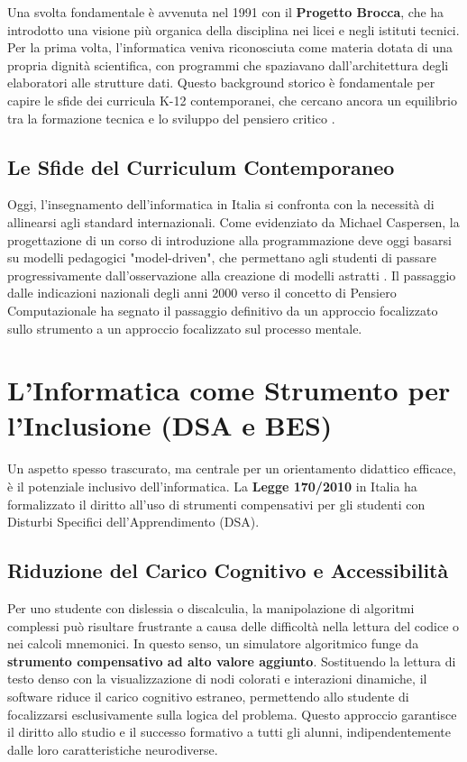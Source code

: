 \documentclass[openany]{theme/uniprthesis}
\begin{document}
Una svolta fondamentale è avvenuta nel 1991 con il \textbf{Progetto Brocca}, che ha introdotto una visione più organica della disciplina nei licei e negli istituti tecnici. Per la prima volta, l'informatica veniva riconosciuta come materia dotata di una propria dignità scientifica, con programmi che spaziavano dall'architettura degli elaboratori alle strutture dati. Questo background storico è fondamentale per capire le sfide dei curricula K-12 contemporanei, che cercano ancora un equilibrio tra la formazione tecnica e lo sviluppo del pensiero critico \cite{gal2014tale}.

\subsection{Le Sfide del Curriculum Contemporaneo}
Oggi, l'insegnamento dell'informatica in Italia si confronta con la necessità di allinearsi agli standard internazionali. Come evidenziato da Michael Caspersen, la progettazione di un corso di introduzione alla programmazione deve oggi basarsi su modelli pedagogici "model-driven", che permettano agli studenti di passare progressivamente dall'osservazione alla creazione di modelli astratti \cite{caspersen2007instructional}. Il passaggio dalle indicazioni nazionali degli anni 2000 verso il concetto di Pensiero Computazionale ha segnato il passaggio definitivo da un approccio focalizzato sullo strumento a un approccio focalizzato sul processo mentale.

\section{L'Informatica come Strumento per l'Inclusione (DSA e BES)}
Un aspetto spesso trascurato, ma centrale per un orientamento didattico efficace, è il potenziale inclusivo dell'informatica. La \textbf{Legge 170/2010} in Italia ha formalizzato il diritto all'uso di strumenti compensativi per gli studenti con Disturbi Specifici dell'Apprendimento (DSA).

\subsection{Riduzione del Carico Cognitivo e Accessibilità}
Per uno studente con dislessia o discalculia, la manipolazione di algoritmi complessi può risultare frustrante a causa delle difficoltà nella lettura del codice o nei calcoli mnemonici. In questo senso, un simulatore algoritmico funge da \textbf{strumento compensativo ad alto valore aggiunto}. Sostituendo la lettura di testo denso con la visualizzazione di nodi colorati e interazioni dinamiche, il software riduce il carico cognitivo estraneo, permettendo allo studente di focalizzarsi esclusivamente sulla logica del problema. Questo approccio garantisce il diritto allo studio e il successo formativo a tutti gli alunni, indipendentemente dalle loro caratteristiche neurodiverse.
\end{document}

